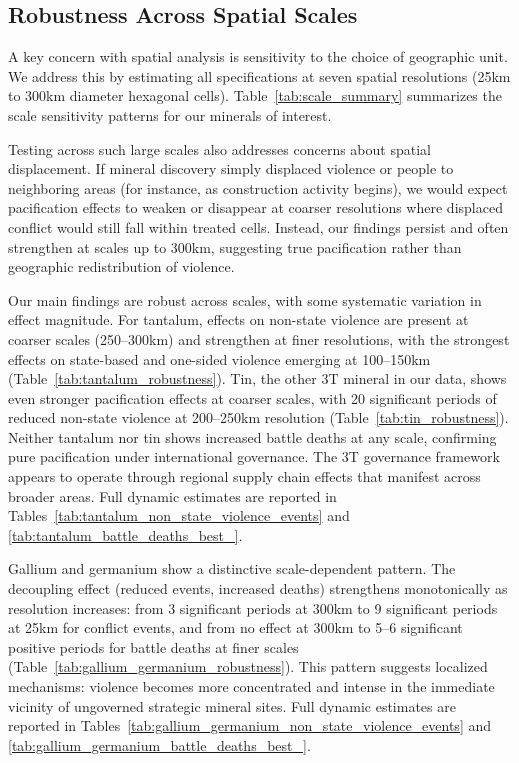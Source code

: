 \documentclass[11pt]{article}
\begin{document}
\subsection{Robustness Across Spatial Scales}

A key concern with spatial analysis is sensitivity to the choice of geographic unit. We address this by estimating all specifications at seven spatial resolutions (25km to 300km diameter hexagonal cells). Table~\ref{tab:scale_summary} summarizes the scale sensitivity patterns for our minerals of interest.

Testing across such large scales also addresses concerns about spatial displacement. If mineral discovery simply displaced violence or people to neighboring areas (for instance, as construction activity begins), we would expect pacification effects to weaken or disappear at coarser resolutions where displaced conflict would still fall within treated cells. Instead, our findings persist and often strengthen at scales up to 300km, suggesting true pacification rather than geographic redistribution of violence.

Our main findings are robust across scales, with some systematic variation in effect magnitude. For tantalum, effects on non-state violence are present at coarser scales (250--300km) and strengthen at finer resolutions, with the strongest effects on state-based and one-sided violence emerging at 100--150km (Table~\ref{tab:tantalum_robustness}). Tin, the other 3T mineral in our data, shows even stronger pacification effects at coarser scales, with 20 significant periods of reduced non-state violence at 200--250km resolution (Table~\ref{tab:tin_robustness}). Neither tantalum nor tin shows increased battle deaths at any scale, confirming pure pacification under international governance. The 3T governance framework appears to operate through regional supply chain effects that manifest across broader areas. Full dynamic estimates are reported in Tables~\ref{tab:tantalum_non_state_violence_events} and \ref{tab:tantalum_battle_deaths_best_}.

Gallium and germanium show a distinctive scale-dependent pattern. The decoupling effect (reduced events, increased deaths) strengthens monotonically as resolution increases: from 3 significant periods at 300km to 9 significant periods at 25km for conflict events, and from no effect at 300km to 5--6 significant positive periods for battle deaths at finer scales (Table~\ref{tab:gallium_germanium_robustness}). This pattern suggests localized mechanisms: violence becomes more concentrated and intense in the immediate vicinity of ungoverned strategic mineral sites. Full dynamic estimates are reported in Tables~\ref{tab:gallium_germanium_non_state_violence_events} and \ref{tab:gallium_germanium_battle_deaths_best_}.
\end{document}
